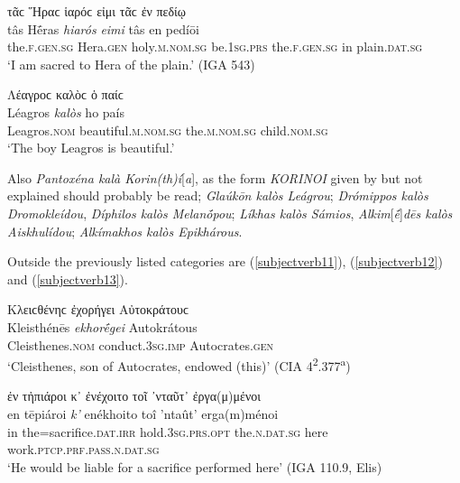 \begin{exe}
\ex τᾶϲ Ἥραϲ ἱαρόϲ εἰμι τᾶϲ ἐν πεδίῳ\\
\gll tâs Hḗras \emph{hiarós} \emph{eimi} tâs en pedíōi\\
the.\textsc{f.gen.sg} Hera.\textsc{gen} holy.\textsc{m.nom.sg} be.\textsc{1sg.prs} the.\textsc{f.gen.sg} in plain.\textsc{dat.sg}\\
\trans `I am sacred to Hera of the plain.' (IGA 543) 
\label{subjectverb9}
\end{exe}

\begin{exe}
\ex Λέαγροϲ καλὸϲ ὁ παίϲ\\
\gll Léagros \emph{kalòs} ho país\\
Leagros.\textsc{nom} beautiful.\textsc{m.nom.sg} the.\textsc{m.nom.sg} child.\textsc{nom.sg}\\
\trans `The boy Leagros is beautiful.' \citep[44]{Klein1890} 
\label{subjectverb10}
\end{exe}

Also \citet[68]{Klein1890} \textit{Pantoxéna \emph{kalà} Korin(th)í}{[}\textit{a}{]},\label{Klein68} as the form \emph{KORINOI} given by \citeauthor{Klein1890} but not explained should probably be read; \citet[81]{Klein1890} \textit{Glaúkōn \emph{kalòs} Leágrou}; \citet[82]{Klein1890} \textit{Drómippos \emph{kalòs} Dromokleídou}, \textit{Díphilos \emph{kalòs} Melanṓpou}; \citep[83]{Klein1890} \textit{Líkhas \emph{kalòs} Sámios}, \textit{Alkim}{[}\textit{ḗ}{]}\textit{dēs \emph{kalòs} Αiskhulídou}; \citet[85]{Klein1890} \textit{Alkímakhos \emph{kalòs} Epikhárous}.

Outside the previously listed categories are (\ref{subjectverb11}), (\ref{subjectverb12}) and (\ref{subjectverb13}).

\begin{exe}
\ex Κλειϲθένηϲ ἐχορήγει Αὐτοκράτουϲ\\
\gll Kleisthénēs \emph{ekhorḗgei} Autokrátous\\
Cleisthenes.\textsc{nom} conduct.\textsc{3sg.imp} Autocrates.\textsc{gen}\\
\trans `Cleisthenes, son of Autocrates, endowed (this)' (CIA 4\textsuperscript{2}.377\textsuperscript{a}) 
\label{subjectverb11}
\end{exe}

\begin{exe}
\ex ἐν τἠπιάροι κ᾽ ἐνέχοιτο τοῖ ᾽νταῦτ᾽ ἐργα(μ)μένοι\\
\gll en tēpiároi \emph{k'} enékhoito toî 'ntaût' erga(m)ménoi\\
in the=sacrifice.\textsc{dat.irr} hold.\textsc{3sg.prs.opt} the.\textsc{n.dat.sg} here work.\textsc{ptcp.prf.pass.n.dat.sg}\\
\trans `He would be liable for a sacrifice performed here' (IGA 110.9, Elis) 
\label{subjectverb12}
\end{exe}


